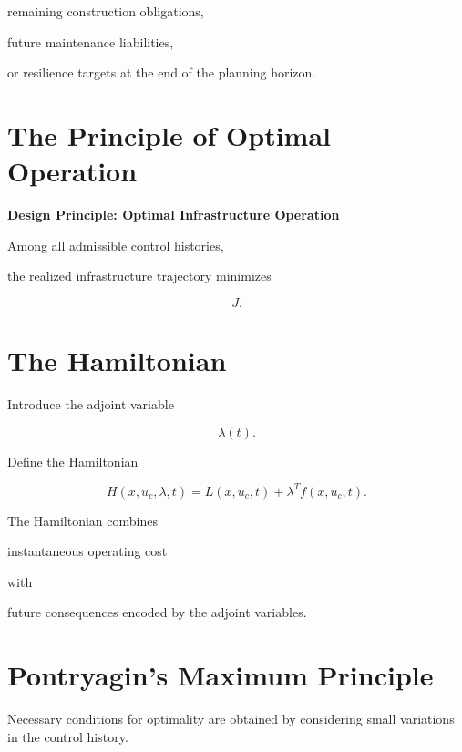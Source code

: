 \documentclass[11pt,fleqn]{book}
\numberwithin{equation}{chapter}
\newenvironment{principle}[1]
  {\begin{principleEnv}
   \noindent\textbf{Design Principle: #1}\par\smallskip\itshape}
  {\end{principleEnv}}
\theoremstyle{plain}
\theoremstyle{definition}
\theoremstyle{remark}
\begin{document}
remaining construction obligations,

future maintenance liabilities,

or resilience targets at the end of the planning horizon.


\section{The Principle of Optimal Operation}


\begin{principle}{Optimal Infrastructure Operation}

Among all admissible control histories,

the realized infrastructure trajectory minimizes

\[
J.
\]

\end{principle}


\section{The Hamiltonian}

Introduce the adjoint variable

\[
\lambda(t).
\]

Define the Hamiltonian

\[
\boxed{
H(x,u_c,\lambda,t)
=
L(x,u_c,t)
+
\lambda^Tf(x,u_c,t).
}
\]

The Hamiltonian combines

instantaneous operating cost

with

future consequences encoded by the adjoint variables.


\section{Pontryagin's Maximum Principle}

Necessary conditions for optimality are obtained by considering small
variations in the control history.

\end{document}
